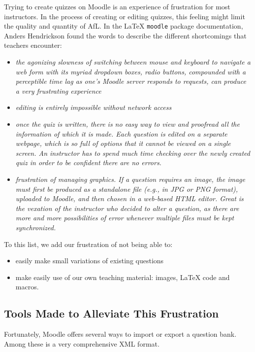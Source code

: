 \documentclass[twocolumn,a4paper,9pt]{article}
\begin{document}
Trying to create quizzes on Moodle is an experience of frustration for most 
instructors. In the process of creating or editing quizzes, this feeling 
might limit the quality and quantity of AfL. In the \LaTeX{} \texttt{moodle} 
package documentation, Anders Hendrickson found the words to describe the 
different shortcomings that teachers encounter:
\begin{itemize}
\item \emph{the agonizing slowness of switching between mouse and keyboard to 
navigate a web form with its myriad dropdown boxes, radio buttons, compounded 
with a perceptible time lag as one’s Moodle server responds to requests, can 
produce a very frustrating experience}
\item \emph{editing is entirely impossible without network access}
\item \emph{once the quiz is written, there is no easy way to view and 
proofread all the information of which it is made. Each question is edited on a 
separate webpage, which is so full of options that it cannot be viewed on a 
single screen. An instructor has to spend much time checking over the newly 
created quiz in order to be confident there are no errors.}
\item \emph{frustration of managing graphics. If a question requires
an image, the image must first be produced as a standalone file (e.g., in JPG 
or PNG format), uploaded to Moodle, and then chosen in a web-based HTML editor. 
Great is the vexation of the instructor who decided to alter a question, as 
there are more and more possibilities of error whenever multiple files must be 
kept synchronized.}
\end{itemize}

To this list, we add our frustration of not being able to:
\begin{itemize}
	\item easily make small variations of existing questions
	\item make easily use of our own teaching material: images, \LaTeX{} code 
	and macros.
\end{itemize}

\subsection{Tools Made to Alleviate This Frustration}

Fortunately, Moodle offers several ways to import or export a question bank. 
Among these is a very comprehensive XML format.
\end{document}
